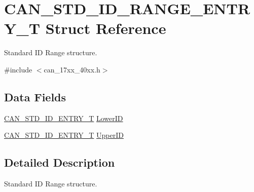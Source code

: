 \hypertarget{structCAN__STD__ID__RANGE__ENTRY__T}{\section{C\-A\-N\-\_\-\-S\-T\-D\-\_\-\-I\-D\-\_\-\-R\-A\-N\-G\-E\-\_\-\-E\-N\-T\-R\-Y\-\_\-\-T Struct Reference}
\label{structCAN__STD__ID__RANGE__ENTRY__T}
}


Standard I\-D Range structure.  




{\ttfamily \#include $<$can\-\_\-17xx\-\_\-40xx.\-h$>$}

\subsection*{Data Fields}
\begin{DoxyCompactItemize}
\item 
\hyperlink{structCAN__STD__ID__ENTRY__T}{C\-A\-N\-\_\-\-S\-T\-D\-\_\-\-I\-D\-\_\-\-E\-N\-T\-R\-Y\-\_\-\-T} \hyperlink{structCAN__STD__ID__RANGE__ENTRY__T_a8e71d9944856371e26c1f42fcdc124f7}{Lower\-I\-D}
\item 
\hyperlink{structCAN__STD__ID__ENTRY__T}{C\-A\-N\-\_\-\-S\-T\-D\-\_\-\-I\-D\-\_\-\-E\-N\-T\-R\-Y\-\_\-\-T} \hyperlink{structCAN__STD__ID__RANGE__ENTRY__T_a5c92aad98ca02e625a651b5509a4bd6e}{Upper\-I\-D}
\end{DoxyCompactItemize}


\subsection{Detailed Description}
Standard I\-D Range structure. 

